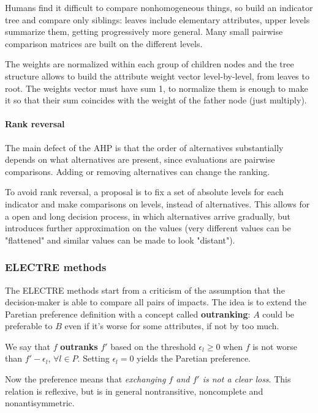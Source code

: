 Humans find it difficult to compare nonhomogeneous things, so build an indicator tree and compare only siblings: leaves include elementary attributes, upper levels summarize them, getting progressively more general. Many small pairwise comparison matrices are built on the different levels.

The weights are normalized within each group of children nodes and the tree structure allows to build the attribute weight vector level-by-level, from leaves to root. The weights vector must have sum 1, to normalize them is enough to make it so that their sum coincides with the weight of the father node (just multiply).

\paragraph{Rank reversal} The main defect of the AHP is that the order of alternatives substantially depends on what alternatives are present, since evaluations are pairwise comparisons. Adding or removing alternatives can change the ranking.

To avoid rank reversal, a proposal is to fix a set of absolute levels for each indicator and make comparisons on levels, instead of alternatives. This allows for a open and long decision process, in which alternatives arrive gradually, but introduces further approximation on the values (very different values can be "flattened" and similar values can be made to look "distant").

\subsubsection{ELECTRE methods}

The ELECTRE methods start from a criticism of the assumption that the decision-maker is able to compare all pairs of impacts. The idea is to extend the Paretian preference definition with a concept called \textbf{outranking}: $A$ could be preferable to $B$ even if it's worse for some attributes, if not by too much.

We say that $f$ \textbf{outranks} $f'$ based on the threshold $\epsilon_l \geq 0$ when $f$ is not worse than $f' - \epsilon_l$, $\forall l \in P$. Setting $\epsilon_l = 0$ yields the Paretian preference. 

Now the preference means that \textit{exchanging $f$ and $f'$ is not a clear loss}. This relation is reflexive, but is in general nontransitive, noncomplete and nonantisymmetric.

